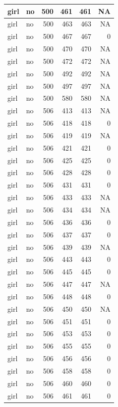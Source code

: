 \documentclass[man]{apa6}
\begin{document}
\begin{tabular}{l|l|r|r|r|r}
\hline
girl & no & 500 & 461 & 461 & NA\\
\hline
girl & no & 500 & 463 & 463 & NA\\
\hline
girl & no & 500 & 467 & 467 & 0\\
\hline
girl & no & 500 & 470 & 470 & NA\\
\hline
girl & no & 500 & 472 & 472 & NA\\
\hline
girl & no & 500 & 492 & 492 & NA\\
\hline
girl & no & 500 & 497 & 497 & NA\\
\hline
girl & no & 500 & 580 & 580 & NA\\
\hline
girl & no & 506 & 413 & 413 & NA\\
\hline
girl & no & 506 & 418 & 418 & 0\\
\hline
girl & no & 506 & 419 & 419 & NA\\
\hline
girl & no & 506 & 421 & 421 & 0\\
\hline
girl & no & 506 & 425 & 425 & 0\\
\hline
girl & no & 506 & 428 & 428 & 0\\
\hline
girl & no & 506 & 431 & 431 & 0\\
\hline
girl & no & 506 & 433 & 433 & NA\\
\hline
girl & no & 506 & 434 & 434 & NA\\
\hline
girl & no & 506 & 436 & 436 & 0\\
\hline
girl & no & 506 & 437 & 437 & 0\\
\hline
girl & no & 506 & 439 & 439 & NA\\
\hline
girl & no & 506 & 443 & 443 & 0\\
\hline
girl & no & 506 & 445 & 445 & 0\\
\hline
girl & no & 506 & 447 & 447 & NA\\
\hline
girl & no & 506 & 448 & 448 & 0\\
\hline
girl & no & 506 & 450 & 450 & NA\\
\hline
girl & no & 506 & 451 & 451 & 0\\
\hline
girl & no & 506 & 453 & 453 & 0\\
\hline
girl & no & 506 & 455 & 455 & 0\\
\hline
girl & no & 506 & 456 & 456 & 0\\
\hline
girl & no & 506 & 458 & 458 & 0\\
\hline
girl & no & 506 & 460 & 460 & 0\\
\hline
girl & no & 506 & 461 & 461 & 0\\

\end{tabular}
\end{document}
